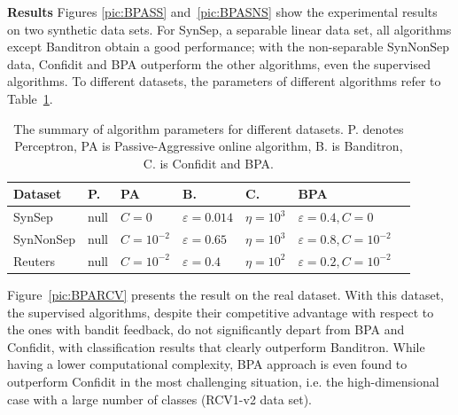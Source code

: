 \documentclass[twocolumn]{article}
\begin{document}
\textbf{Results}
Figures \ref{pic:BPASS} and~\ref{pic:BPASNS} show the experimental results on two synthetic data sets. For SynSep, a separable linear data set, all algorithms except Banditron obtain a good performance; with the non-separable SynNonSep data, Confidit and BPA outperform the other algorithms, even the supervised algorithms.  To different datasets, the parameters of different algorithms refer to Table~\ref{table:bpa}.
\begin{table}[h]
	\caption{The summary of algorithm parameters for different datasets. P. denotes Perceptron, PA is Passive-Aggressive online algorithm, B. is Banditron, C. is Confidit and BPA.}
	\label{table:bpa}
	\begin{center}
		\begin{tabular}{lllllll}
			{\bf Dataset}  & {\bf P.} & {\bf PA } & {\bf B.}& {\bf C.} & {\bf BPA}\\
			\hline
			SynSep & null & $C=0$ & $\varepsilon = 0.014$ &$\eta = 10^3$ & $\varepsilon = 0.4,C = 0$\\
			
			SynNonSep & null & $C=10^{-2}$ & $\varepsilon =0.65$ & $\eta = 10^3$& $\varepsilon = 0.8,C = 10^{-2}$\\
			
			Reuters & null & $C=10^{-2}$ & $\varepsilon =0.4$ & $\eta = 10^2$ & $\varepsilon = 0.2,C = 10^{-2}$\\
			
			
			
		\end{tabular}
	\end{center}
\end{table}


Figure~\ref{pic:BPARCV} %
presents the result on the real dataset. With this dataset, the supervised algorithms, despite their competitive advantage with respect to the ones with bandit feedback, do not significantly depart from BPA and Confidit, with classification results that clearly outperform Banditron. While having a lower computational complexity, BPA approach is even found to outperform Confidit in the most challenging situation, i.e. the high-dimensional case with a large number of classes (RCV1-v2 data set).
\end{document}
